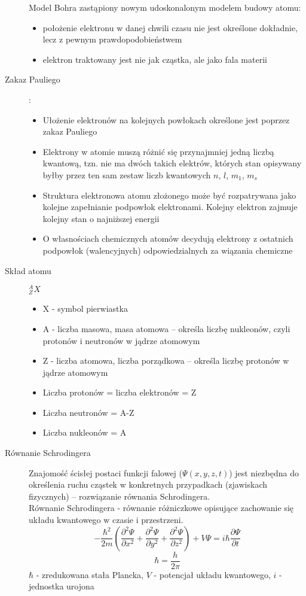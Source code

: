 \documentclass[a4paper,11pt]{article}
\begin{document}
\begin{description}
  Model Bohra zastąpiony nowym udoskonalonym modelem budowy atomu:
  \begin{itemize}
  \item położenie elektronu w danej chwili czasu nie jest określone dokładnie, lecz z pewnym prawdopodobieństwem
  \item elektron traktowany jest nie jak cząstka, ale jako fala materii
  \end{itemize}
\item[Zakaz Pauliego]: 
  \begin{itemize}
  \item Ułożenie elektronów na kolejnych powłokach określone jest poprzez zakaz Pauliego
  \item Elektrony w atomie muszą różnić się przynajmniej jedną liczbą kwantową, tzn. nie ma dwóch takich elektrów, których stan opisywany byłby przez ten sam zestaw liczb kwantowych $n$, $l$, $m_1$, $m_s$
  \item Struktura elektronowa atomu złożonego może być rozpatrywana jako kolejne zapełnianie podpowłok elektronami. Kolejny elektron zajmuje kolejny stan o najniższej energii
  \item O własnościach chemicznych atomów decydują elektrony z ostatnich podpowłok (walencyjnych) odpowiedzialnych za wiązania chemiczne
  \end{itemize}
\item[Skład atomu] $^A_ZX$
  \begin{itemize}
  \item X - symbol pierwiastka
  \item A - liczba masowa, masa atomowa -- określa liczbę nukleonów, czyli protonów i neutronów w jądrze atomowym
  \item Z - liczba atomowa, liczba porządkowa -- określa liczbę protonów w jądrze atomowym
  \item Liczba protonów = liczba elektronów = Z
  \item Liczba neutronów = A-Z
  \item Liczba nukleonów = A
  \end{itemize}

\item[Równanie Schrodingera] Znajomość ścisłej postaci funkcji falowej ($\Psi(x,y,z,t)$) jest niezbędna do określenia ruchu cząstek w konkretnych przypadkach (zjawiskach fizycznych) -- rozwiązanie równania Schrodingera.\\
  Równanie Schrodingera - równanie różniczkowe opisujące zachowanie się układu kwantowego w czasie i przestrzeni.
  $$-\frac{\hbar^2}{2m}\left( \frac{\partial^2\Psi}{\partial x^2} + \frac{\partial^2\Psi}{\partial y^2} + \frac{\partial^2\Psi}{\partial z^2}\right) + V\Psi = i\hbar\frac{\partial\Psi}{\partial t}$$
  $$\hbar=\frac{h}{2\pi}$$ $\hbar$ - zredukowana stała Plancka, $V$ - potencjał układu kwantowego, $i$ -jednostka urojona


\end{description}
\end{document}
